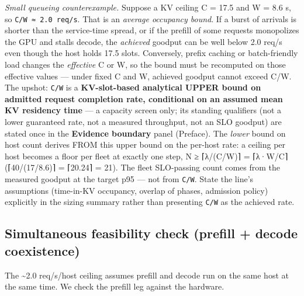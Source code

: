 \emph{Small queueing counterexample.} Suppose a KV ceiling C = 17.5 and
W = 8.6 s, so \texttt{C/W\ ≈\ 2.0\ req/s}. That is an \emph{average
occupancy bound}. If a burst of arrivals is shorter than the
service-time spread, or if the prefill of some requests monopolizes the
GPU and stalls decode, the \emph{achieved} goodput can be well below 2.0
req/s even though the host holds 17.5 slots. Conversely, prefix caching
or batch-friendly load changes the \emph{effective} C or W, so the bound
must be recomputed on those effective values --- under fixed C and W,
achieved goodput cannot exceed C/W. The upshot: \texttt{C/W} is a
\textbf{KV-slot-based analytical UPPER bound on admitted request
completion rate, conditional on an assumed mean KV residency time} --- a
capacity screen only; its standing qualifiers (not a lower guaranteed
rate, not a measured throughput, not an SLO goodput) are stated once in
the \textbf{Evidence boundary} panel (Preface). The \emph{lower} bound
on host count derives FROM this upper bound on the per-host rate: a
ceiling per host becomes a floor per fleet at exactly one step, N ≥
⌈λ/(C/W)⌉ = ⌈λ·W/C⌉ (⌈40/(17/8.6)⌉ = ⌈20.24⌉ = 21). The fleet
SLO-passing count comes from the measured goodput at the target p95 ---
not from \texttt{C/W}. State the line's assumptions (time-in-KV
occupancy, overlap of phases, admission policy) explicitly in the sizing
summary rather than presenting \texttt{C/W} as the achieved rate.

\subsection{Simultaneous feasibility check (prefill + decode
coexistence)}\label{simultaneous-feasibility-check-prefill-decode-coexistence}

The \textasciitilde2.0 req/s/host ceiling assumes prefill and decode run
on the same host at the same time. We check the prefill leg against the
hardware.

